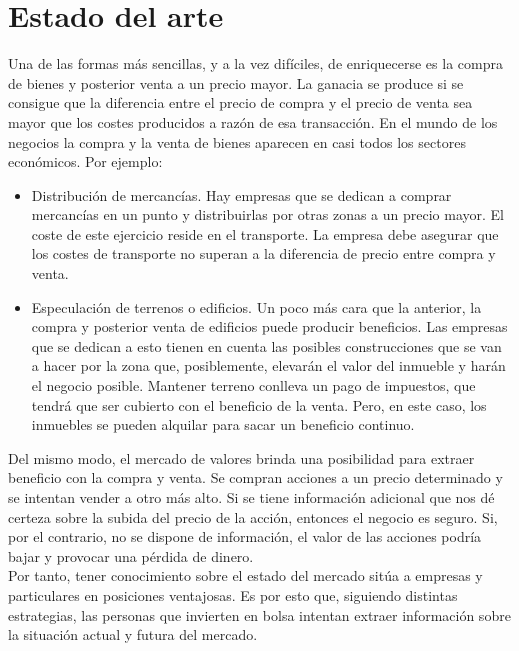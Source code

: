 \section{Estado del arte}

Una de las formas más sencillas, y a la vez dif\'iciles, de enriquecerse es la compra de bienes y posterior venta a un precio mayor. La ganacia se produce si se consigue que la diferencia entre el precio de compra y el precio de venta sea mayor que los costes producidos a raz\'on de esa transacci\'on. En el mundo de los negocios la compra y la venta de bienes aparecen en casi todos los sectores econ\'omicos. Por ejemplo:\\

\begin{itemize}
    \item Distribuci\'on de mercanc\'ias. Hay empresas que se dedican a comprar mercanc\'ias en un punto y distribuirlas por otras zonas a un precio mayor. El coste de este ejercicio reside en el transporte. La empresa debe asegurar que los costes de transporte no superan a la diferencia de precio entre compra y venta.
    
    \item Especulaci\'on de terrenos o edificios. Un poco m\'as cara que la anterior, la compra y posterior venta de edificios puede producir beneficios. Las empresas que se dedican a esto tienen en cuenta las posibles construcciones que se van a hacer por la zona que, posiblemente, elevar\'an el valor del inmueble y har\'an el negocio posible. Mantener terreno conlleva un pago de impuestos, que tendr\'a que ser cubierto con el beneficio de la venta. Pero, en este caso, los inmuebles se pueden alquilar para sacar un beneficio continuo.
\end{itemize}

Del mismo modo, el mercado de valores brinda una posibilidad para extraer beneficio con la compra y venta. Se compran acciones a un precio determinado y se intentan vender a otro m\'as alto. Si se tiene informaci\'on adicional que nos d\'e certeza sobre la subida del precio de la acci\'on, entonces el negocio es seguro. Si, por el contrario, no se dispone de informaci\'on, el valor de las acciones podr\'ia bajar y provocar una p\'erdida de dinero.\\

Por tanto, tener conocimiento sobre el estado del mercado sit\'ua a empresas y particulares en posiciones ventajosas. Es por esto que, siguiendo distintas estrategias, las personas que invierten en bolsa intentan extraer informaci\'on sobre la situaci\'on actual y futura del mercado.\\

